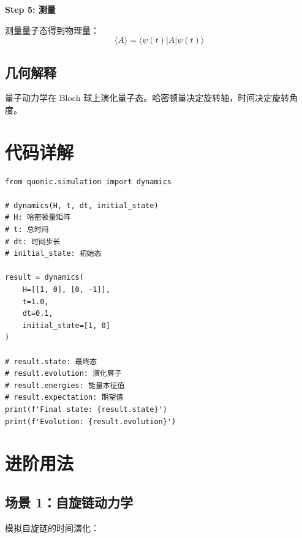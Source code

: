 \documentclass[12pt,a4paper]{article}
\begin{document}
\textbf{Step 5: 测量}

测量量子态得到物理量：
\begin{equation}
\langle A \rangle = \langle\psi(t)|A|\psi(t)\rangle
\end{equation}

\subsection{几何解释}

量子动力学在 Bloch 球上演化量子态。哈密顿量决定旋转轴，时间决定旋转角度。

\section{代码详解}

\begin{verbatim}
from quonic.simulation import dynamics

# dynamics(H, t, dt, initial_state)
# H: 哈密顿量矩阵
# t: 总时间
# dt: 时间步长
# initial_state: 初始态

result = dynamics(
    H=[[1, 0], [0, -1]],
    t=1.0,
    dt=0.1,
    initial_state=[1, 0]
)

# result.state: 最终态
# result.evolution: 演化算子
# result.energies: 能量本征值
# result.expectation: 期望值
print(f'Final state: {result.state}')
print(f'Evolution: {result.evolution}')
\end{verbatim}

\section{进阶用法}

\subsection{场景 1：自旋链动力学}

模拟自旋链的时间演化：
\end{document}
